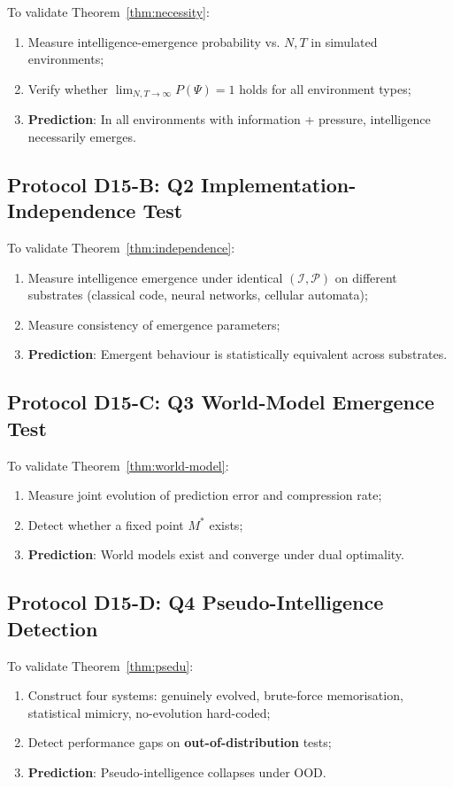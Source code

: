 \documentclass[12pt, a4paper]{article}
\newcommand{\calI}{\mathcal{I}}
\newcommand{\calP}{\mathcal{P}}
\begin{document}
To validate Theorem~\ref{thm:necessity}:
\begin{enumerate}
\item Measure intelligence-emergence probability vs. $N, T$ in simulated environments;
\item Verify whether $\displaystyle\lim_{N,T\to\infty}P(\Psi) = 1$ holds for all environment types;
\item \textbf{Prediction}: In all environments with information + pressure, intelligence necessarily emerges.
\end{enumerate}

\subsection{Protocol D15-B: Q2 Implementation-Independence Test}

To validate Theorem~\ref{thm:independence}:
\begin{enumerate}
\item Measure intelligence emergence under identical $(\calI,\calP)$ on different substrates (classical code, neural networks, cellular automata);
\item Measure consistency of emergence parameters;
\item \textbf{Prediction}: Emergent behaviour is statistically equivalent across substrates.
\end{enumerate}

\subsection{Protocol D15-C: Q3 World-Model Emergence Test}

To validate Theorem~\ref{thm:world-model}:
\begin{enumerate}
\item Measure joint evolution of prediction error and compression rate;
\item Detect whether a fixed point $M^{*}$ exists;
\item \textbf{Prediction}: World models exist and converge under dual optimality.
\end{enumerate}

\subsection{Protocol D15-D: Q4 Pseudo-Intelligence Detection}

To validate Theorem~\ref{thm:psedu}:
\begin{enumerate}
\item Construct four systems: genuinely evolved, brute-force memorisation, statistical mimicry, no-evolution hard-coded;
\item Detect performance gaps on \textbf{out-of-distribution} tests;
\item \textbf{Prediction}: Pseudo-intelligence collapses under OOD.
\end{enumerate}
\end{document}
